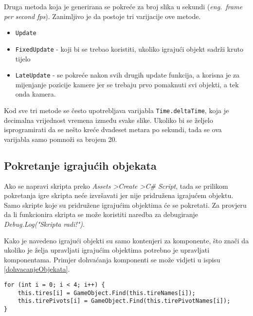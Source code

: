 Druga metoda koja je generirana se pokreće za broj slika u sekundi (\emph{eng.~frame per second fps}). Zanimljivo je da postoje tri varijacije ove metode.
\begin{itemize} 
	\item \texttt{Update}
	\item \texttt{FixedUpdate} - koji bi se trebao koristiti, ukoliko igrajući objekt sadrži kruto tijelo
	\item \texttt{LateUpdate} - se pokreće nakon svih drugih update funkcija, a korisna je za mijenjanje pozicije kamere jer se trebaju prvo pomaknuti svi objekti, a tek onda kamera. 
\end{itemize}
Kod sve tri metode se često upotrebljava varijabla \texttt{Time.deltaTime}, koja je decimalna vrijednost vremena između svake slike. Ukoliko bi se željelo isprogramirati da se nešto kreće dvadeset metara po sekundi, tada se ova varijabla samo pomnoži sa brojem 20.
\subsection{Pokretanje igrajućih objekata}
Ako se napravi skripta preko \emph{Assets \textgreater Create \textgreater C\# Script}, tada se prilikom pokretanja igre skripta neće izvršavati jer nije pridružena igrajućem objektu. Samo skripte koje su pridružene igrajućim objektima će se pokretati. Za provjeru da li funkcionira skripta se može koristiti naredba za debugiranje \emph{Debug.Log("Skripta radi!")}. 

Kako je navedeno igrajući objekti su samo kontenjeri za komponente, što znači da ukoliko je želja upravljati igrajućim objektima potrebno je upravljati komponentama. Primjer dohvaćanja komponenti se može vidjeti u ispisu \ref{dohvacanjeObjekata}. 
\begin{lstlisting}[caption={Dohvaćanje objekata}, label=dohvacanjeObjekata]
for (int i = 0; i < 4; i++) {
	this.tires[i] = GameObject.Find(this.tireNames[i]);
	this.tirePivots[i] = GameObject.Find(this.tirePivotNames[i]);
}
\end{lstlisting}
